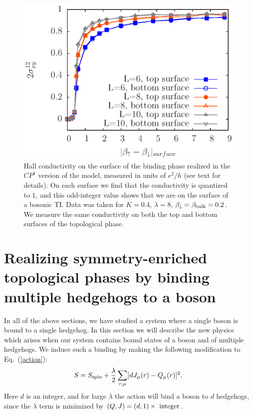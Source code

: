 \documentclass[prb,twocolumn]{revtex4-1}
\begin{document}
\begin{figure}
\includegraphics[width=\linewidth]{figures/cp1hall.eps}
\caption{Hall conductivity on the surface of the binding phase realized in the $CP^1$ version of the model, measured in units of $e^2/h$ (see text for details). On each surface we find that the conductivity is quantized to $1$, and this odd-integer value shows that we are on the surface of a bosonic TI. Data was taken for $K=0.4$, $\lambda=8$, $\beta_\downarrow=\beta_{\rm bulk}=0.2$. We measure the same conductivity on both the top and bottom surfaces of the topological phase.
}
\label{cp1hall}
\end{figure}


\section{Realizing symmetry-enriched topological phases by binding multiple hedgehogs to a boson}
\label{section::multiple}

In all of the above sections, we have studied a system where a single boson is bound to a single hedgehog. In this section we will describe the new physics which arises when our system contains bound states of a boson and of multiple hedgehogs. We induce such a binding by making the following modification to Eq.~(\ref{action}):
\begin{equation}
S=S_{\rm spin}+\frac{\lambda}{2}\sum_{r,\mu} [ dJ_\mu(r)- Q_\mu(r)]^2.
\label{cdbind}
\end{equation}
Here $d$ is an integer, and for large $\lambda$ the action will bind a boson to $d$ hedgehogs, since the $\lambda$ term is minimized by $(Q, J) = (d, 1) \times~{\rm integer}$. 
\end{document}
